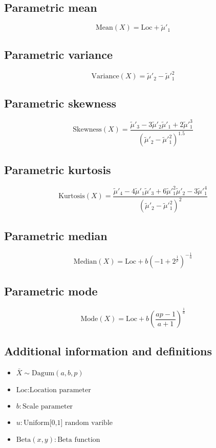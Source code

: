\documentclass{article}
\begin{document}
\subsection{Parametric mean}
\begin{equation*} \mathrm{Mean}(X)=\text{Loc}+\tilde{\mu}'_{1} \end{equation*}
\subsection{Parametric variance}
\begin{equation*} \mathrm{Variance}(X)=\tilde{\mu}'_{2}-\tilde{\mu}'^{2}_{1} \end{equation*}
\subsection{Parametric skewness}
\begin{equation*} \mathrm{Skewness}(X)=\frac{\tilde{\mu}'_{3}-3\tilde{\mu}'_{2}\tilde{\mu}'_{1}+2\tilde{\mu}'^{3}_{1}}{(\tilde{\mu}'_{2}-\tilde{\mu}'^{2}_{1})^{1.5}} \end{equation*}
\subsection{Parametric kurtosis}
\begin{equation*} \mathrm{Kurtosis}(X)=\frac{\tilde{\mu}'_{4}-4\tilde{\mu}'_{1}\tilde{\mu}'_{3}+6\tilde{\mu}'^{2}_{1}\tilde{\mu}'_{2}-3\tilde{\mu}'^{4}_{1}}{(\tilde{\mu}'_{2}-\tilde{\mu}'^{2}_{1})^{2}} \end{equation*}
\subsection{Parametric median}
\begin{equation*} \mathrm{Median}(X)=\text{Loc}+b{\left(-1+2^{\tfrac{1}{p}}\right)}^{-\tfrac{1}{a}} \end{equation*}
\subsection{Parametric mode}
\begin{equation*} \mathrm{Mode}(X)=\text{Loc}+b{\left(\frac{ap-1}{a+1}\right)}^{\tfrac{1}{a}} \end{equation*}
\subsection{Additional information and definitions}
\begin{itemize}
    \item $ \bar{X}\sim\mathrm{Dagum}\left(a,b,p\right) $
    \item $ \text{Loc}:\text{Location parameter} $
    \item $ b:\text{Scale parameter} $
    \item $ u:\text{Uniform[0,1] random varible} $
    \item $ \text{Beta}\left(x,y\right):\text{Beta function} $
\end{itemize}
\end{document}
